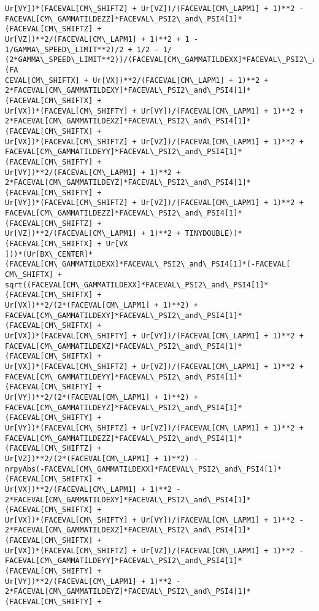 \documentclass[landscape,letterpaper,10pt,english]{article}
\begin{document}
\begin{Verbatim}[commandchars=\\\{\}]
Ur[VY])*(FACEVAL[CM\_SHIFTZ] + Ur[VZ])/(FACEVAL[CM\_LAPM1] + 1)**2 -
FACEVAL[CM\_GAMMATILDEZZ]*FACEVAL\_PSI2\_and\_PSI4[1]*(FACEVAL[CM\_SHIFTZ] +
Ur[VZ])**2/(FACEVAL[CM\_LAPM1] + 1)**2 + 1 - 1/GAMMA\_SPEED\_LIMIT**2)/2 + 1/2 - 1/
(2*GAMMA\_SPEED\_LIMIT**2))/(FACEVAL[CM\_GAMMATILDEXX]*FACEVAL\_PSI2\_and\_PSI4[1]*(FA
CEVAL[CM\_SHIFTX] + Ur[VX])**2/(FACEVAL[CM\_LAPM1] + 1)**2 +
2*FACEVAL[CM\_GAMMATILDEXY]*FACEVAL\_PSI2\_and\_PSI4[1]*(FACEVAL[CM\_SHIFTX] +
Ur[VX])*(FACEVAL[CM\_SHIFTY] + Ur[VY])/(FACEVAL[CM\_LAPM1] + 1)**2 +
2*FACEVAL[CM\_GAMMATILDEXZ]*FACEVAL\_PSI2\_and\_PSI4[1]*(FACEVAL[CM\_SHIFTX] +
Ur[VX])*(FACEVAL[CM\_SHIFTZ] + Ur[VZ])/(FACEVAL[CM\_LAPM1] + 1)**2 +
FACEVAL[CM\_GAMMATILDEYY]*FACEVAL\_PSI2\_and\_PSI4[1]*(FACEVAL[CM\_SHIFTY] +
Ur[VY])**2/(FACEVAL[CM\_LAPM1] + 1)**2 +
2*FACEVAL[CM\_GAMMATILDEYZ]*FACEVAL\_PSI2\_and\_PSI4[1]*(FACEVAL[CM\_SHIFTY] +
Ur[VY])*(FACEVAL[CM\_SHIFTZ] + Ur[VZ])/(FACEVAL[CM\_LAPM1] + 1)**2 +
FACEVAL[CM\_GAMMATILDEZZ]*FACEVAL\_PSI2\_and\_PSI4[1]*(FACEVAL[CM\_SHIFTZ] +
Ur[VZ])**2/(FACEVAL[CM\_LAPM1] + 1)**2 + TINYDOUBLE))*(FACEVAL[CM\_SHIFTX] + Ur[VX
]))*(Ur[BX\_CENTER]*(FACEVAL[CM\_GAMMATILDEXX]*FACEVAL\_PSI2\_and\_PSI4[1]*(-FACEVAL[
CM\_SHIFTX] +
sqrt((FACEVAL[CM\_GAMMATILDEXX]*FACEVAL\_PSI2\_and\_PSI4[1]*(FACEVAL[CM\_SHIFTX] +
Ur[VX])**2/(2*(FACEVAL[CM\_LAPM1] + 1)**2) +
FACEVAL[CM\_GAMMATILDEXY]*FACEVAL\_PSI2\_and\_PSI4[1]*(FACEVAL[CM\_SHIFTX] +
Ur[VX])*(FACEVAL[CM\_SHIFTY] + Ur[VY])/(FACEVAL[CM\_LAPM1] + 1)**2 +
FACEVAL[CM\_GAMMATILDEXZ]*FACEVAL\_PSI2\_and\_PSI4[1]*(FACEVAL[CM\_SHIFTX] +
Ur[VX])*(FACEVAL[CM\_SHIFTZ] + Ur[VZ])/(FACEVAL[CM\_LAPM1] + 1)**2 +
FACEVAL[CM\_GAMMATILDEYY]*FACEVAL\_PSI2\_and\_PSI4[1]*(FACEVAL[CM\_SHIFTY] +
Ur[VY])**2/(2*(FACEVAL[CM\_LAPM1] + 1)**2) +
FACEVAL[CM\_GAMMATILDEYZ]*FACEVAL\_PSI2\_and\_PSI4[1]*(FACEVAL[CM\_SHIFTY] +
Ur[VY])*(FACEVAL[CM\_SHIFTZ] + Ur[VZ])/(FACEVAL[CM\_LAPM1] + 1)**2 +
FACEVAL[CM\_GAMMATILDEZZ]*FACEVAL\_PSI2\_and\_PSI4[1]*(FACEVAL[CM\_SHIFTZ] +
Ur[VZ])**2/(2*(FACEVAL[CM\_LAPM1] + 1)**2) -
nrpyAbs(-FACEVAL[CM\_GAMMATILDEXX]*FACEVAL\_PSI2\_and\_PSI4[1]*(FACEVAL[CM\_SHIFTX] +
Ur[VX])**2/(FACEVAL[CM\_LAPM1] + 1)**2 -
2*FACEVAL[CM\_GAMMATILDEXY]*FACEVAL\_PSI2\_and\_PSI4[1]*(FACEVAL[CM\_SHIFTX] +
Ur[VX])*(FACEVAL[CM\_SHIFTY] + Ur[VY])/(FACEVAL[CM\_LAPM1] + 1)**2 -
2*FACEVAL[CM\_GAMMATILDEXZ]*FACEVAL\_PSI2\_and\_PSI4[1]*(FACEVAL[CM\_SHIFTX] +
Ur[VX])*(FACEVAL[CM\_SHIFTZ] + Ur[VZ])/(FACEVAL[CM\_LAPM1] + 1)**2 -
FACEVAL[CM\_GAMMATILDEYY]*FACEVAL\_PSI2\_and\_PSI4[1]*(FACEVAL[CM\_SHIFTY] +
Ur[VY])**2/(FACEVAL[CM\_LAPM1] + 1)**2 -
2*FACEVAL[CM\_GAMMATILDEYZ]*FACEVAL\_PSI2\_and\_PSI4[1]*(FACEVAL[CM\_SHIFTY] +

\end{Verbatim}
\end{document}
